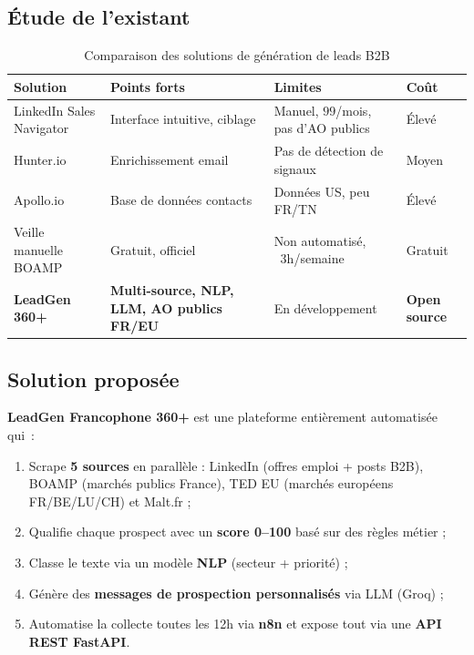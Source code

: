 \subsection{Étude de l'existant}

\begin{table}[H]
  \centering
  \begin{tabular}{L{3cm} L{3.5cm} L{3.5cm} L{3cm}}
    \toprule
    \textbf{Solution} & \textbf{Points forts} & \textbf{Limites} & \textbf{Coût} \\
    \midrule
    LinkedIn Sales Navigator & Interface intuitive, ciblage & Manuel, $99$/mois, pas d'AO publics & Élevé \\
    \addlinespace
    Hunter.io & Enrichissement email & Pas de détection de signaux & Moyen \\
    \addlinespace
    Apollo.io & Base de données contacts & Données US, peu FR/TN & Élevé \\
    \addlinespace
    Veille manuelle BOAMP & Gratuit, officiel & Non automatisé, ~3h/semaine & Gratuit \\
    \addlinespace
    \textbf{LeadGen 360+} & \textbf{Multi-source, NLP, LLM, AO publics FR/EU} & En développement & \textbf{Open source} \\
    \bottomrule
  \end{tabular}
  \caption{Comparaison des solutions de génération de leads B2B}
  \label{tab:existant}
\end{table}

\subsection{Solution proposée}

\textbf{LeadGen Francophone 360+} est une plateforme entièrement automatisée qui~:

\begin{enumerate}
  \item Scrape \textbf{5 sources} en parallèle : LinkedIn (offres emploi + posts B2B),
        BOAMP (marchés publics France), TED EU (marchés européens FR/BE/LU/CH) et Malt.fr ;
  \item Qualifie chaque prospect avec un \textbf{score 0--100} basé sur des règles métier ;
  \item Classe le texte via un modèle \textbf{NLP} (secteur + priorité) ;
  \item Génère des \textbf{messages de prospection personnalisés} via LLM (Groq) ;
  \item Automatise la collecte toutes les 12h via \textbf{n8n} et expose tout via une
        \textbf{API REST FastAPI}.
\end{enumerate}

